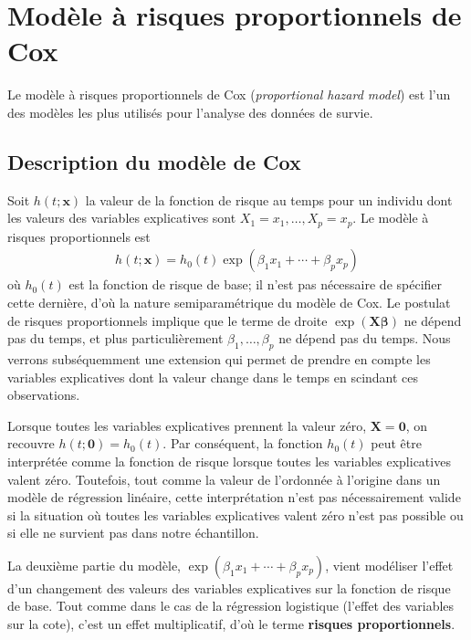 \documentclass[
  11pt,
  letterpaper,
]{book}
\theoremstyle{definition}
\theoremstyle{remark}
\begin{document}
\hypertarget{moduxe8le-uxe0-risques-proportionnels-de-cox}{%
\section{Modèle à risques proportionnels de
Cox}\label{moduxe8le-uxe0-risques-proportionnels-de-cox}}

Le modèle à risques proportionnels de Cox (\emph{proportional hazard
model}) est l'un des modèles les plus utilisés pour l'analyse des
données de survie.

\hypertarget{description-du-moduxe8le-de-cox}{%
\subsection{Description du modèle de
Cox}\label{description-du-moduxe8le-de-cox}}

Soit \(h(t; \boldsymbol{x})\) la valeur de la fonction de risque au
temps pour un individu dont les valeurs des variables explicatives sont
\(X_1=x_1, \ldots, X_p=x_p\). Le modèle à risques proportionnels est
\begin{align*}
h(t; \boldsymbol{x}) = h_0(t)\exp(\beta_1x_1 + \cdots + \beta_p x_p)
\end{align*} où \(h_0(t)\) est la fonction de risque de base; il n'est
pas nécessaire de spécifier cette dernière, d'où la nature
semiparamétrique du modèle de Cox. Le postulat de risques proportionnels
implique que le terme de droite \(\exp(\mathbf{X}\boldsymbol{\beta})\)
ne dépend pas du temps, et plus particulièrement
\(\beta_1, \ldots, \beta_p\) ne dépend pas du temps. Nous verrons
subséquemment une extension qui permet de prendre en compte les
variables explicatives dont la valeur change dans le temps en scindant
ces observations.

Lorsque toutes les variables explicatives prennent la valeur zéro,
\(\boldsymbol{X}=\boldsymbol{0}\), on recouvre
\(h(t; \boldsymbol{0})= h_0(t)\). Par conséquent, la fonction \(h_0(t)\)
peut être interprétée comme la fonction de risque lorsque toutes les
variables explicatives valent zéro. Toutefois, tout comme la valeur de
l'ordonnée à l'origine dans un modèle de régression linéaire, cette
interprétation n'est pas nécessairement valide si la situation où toutes
les variables explicatives valent zéro n'est pas possible ou si elle ne
survient pas dans notre échantillon.

La deuxième partie du modèle,
\(\exp(\beta_1x_1 + \cdots + \beta_p x_p)\), vient modéliser l'effet
d'un changement des valeurs des variables explicatives sur la fonction
de risque de base. Tout comme dans le cas de la régression logistique
(l'effet des variables sur la cote), c'est un effet multiplicatif, d'où
le terme \textbf{risques proportionnels}.
\end{document}
